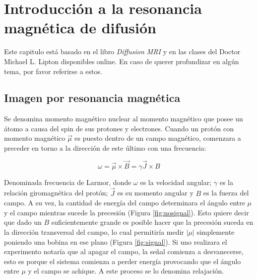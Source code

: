 \chapter{Introducci\'on a la resonancia magn\'etica de difusi\'on}
\label{ch:bkgrnd}

Este capitulo est\'a basado en el libro \textit{Diffusion MRI} \cite{Basser2009}
y en las clases del Doctor Michael L. Lipton \cite{Lipton2014} disponibles online. 
En caso de querer profundizar en alg\'un tema, por favor referirse a estos. 

\section{Imagen por resonancia magnética}
Se denomina momento magn\'etico nuclear al momento magn\'etico que posee un 
\'atomo a causa del spin de sus protones y electrones. Cuando un prot\'on con 
momento magn\'etico $\vec{\mu}$ es puesto dentro de un campo magn\'etico, 
comenzara a preceder en torno a la direcci\'on de este \'ultimo con una 
frecuencia: 

$$ \omega = \vec{\mu} \times \vec{B} = \gamma \vec{J} \times B $$

Denominada frecuencia de Larmor, donde $\omega$ es la velocidad angular; $\gamma$ es
la relaci\'on giromagn\'etica del prot\'on; $\vec{J}$ es su momento angular y $B$
es la fuerza del campo. A su vez, la cantidad de energ\'ia del campo determinara
el \'angulo entre $\mu$ y el campo mientras sucede la precesi\'on
(Figura \ref{fig:nosignal}). Esto quiere decir que dado un $B$ suficientemente 
grande es posible hacer que la precesi\'on suceda en la direcci\'on transversal
del campo, lo cual permitir\'ia medir $|\mu|$ simplemente poniendo una bobina en
ese plano (Figura \ref{fig:signal}). Si uno realizara el experimento notar\'ia
que al apagar el campo, la se\~nal comienza a desvanecerse, esto es porque el
sistema comienza a perder energ\'ia provocando que el \'angulo entre $\mu$ y el
campo se achique. A este proceso se lo denomina relajaci\'on. \\

